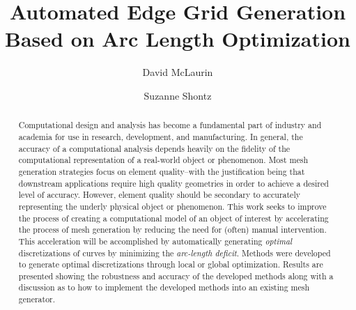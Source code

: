 \documentclass{svmult}
\begin{document}
\title*{Automated Edge Grid Generation Based on Arc Length Optimization}
\author{David McLaurin\and
Suzanne Shontz}
%
%
\maketitle

\begin{abstract}
Computational design and analysis has become a fundamental part of industry and academia for use in research, development, and manufacturing.  In general, the accuracy of a computational analysis depends heavily on the fidelity of the computational representation of a real-world object or phenomenon. Most mesh generation strategies focus on element quality--with the justification being that downstream applications require high quality geometries in order to achieve a desired level of accuracy. However, element quality should be secondary to accurately representing the underly physical object or phenomenon. This work seeks to improve the process of creating a computational model of an object of interest by accelerating the process of mesh generation by reducing the need for (often) manual intervention. This acceleration will be accomplished by automatically generating \textit{optimal} discretizations of curves by minimizing the \textit{arc-length deficit}. Methods were developed to generate optimal discretizations through local or global optimization. Results are presented showing the robustness and accuracy of the developed methods along with a discussion as to how to implement the developed methods into an existing mesh generator.
\end{abstract}
\end{document}
